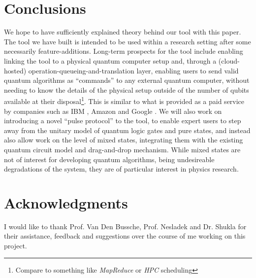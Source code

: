 \documentclass[conference]{IEEEtran}
\begin{document}
\section*{Conclusions}

We hope to have sufficiently explained theory behind our tool with this paper.
The tool we have built is intended to be used within a research setting after some necessarily feature-additions.
Long-term prospects for the tool include enabling linking the tool to a physical quantum computer setup
and, through a (cloud-hosted) operation-queueing-and-translation layer,
enabling users to send valid quantum algorithms as ``commands'' to any
external quantum computer, without needing to know the details of the physical
setup outside of the number of qubits available at their disposal\footnote{Compare to something like
\textit{MapReduce}\cite{ref:mapReduceApacheHadoop} or \textit{HPC}\cite{ref:HPCSchedulingBasics} scheduling}.
This is similar to what is provided as a paid service by companies such as IBM \cite{ref:ibmqiskitdocs},
Amazon \cite{ref:amazonbraket} and Google \cite{ref:googlecirqdocs}.
We will also work on introducing a novel ``pulse protocol'' to the tool, to enable expert users
to step away from the unitary model of quantum logic gates and pure states,
and instead also allow work on the level of mixed states, integrating them with the existing
quantum circuit model and drag-and-drop mechanism.
While mixed states are not of interest for developing quantum algorithms, being undesireable degradations of the system,
they are of particular interest in physics research.

\section*{Acknowledgments}

I would like to thank Prof. Van Den Bussche, Prof. Nesladek and Dr. Shukla for their assistance,
feedback and suggestions over the course of me working on this project.



\clearpage
\end{document}
